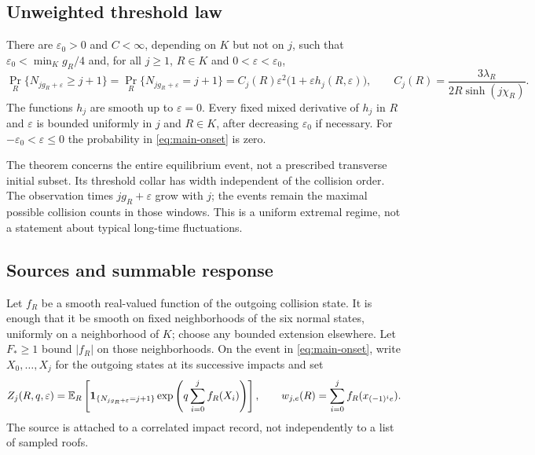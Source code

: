 \subsection{Unweighted threshold law}
\begin{theorem}\label{thm:unweighted}
There are $\varepsilon_0>0$ and $C<\infty$, depending on $K$ but not on
$j$, such that $\varepsilon_0<\min_K g_R/4$ and, for all $j\ge1$,
$R\in K$ and $0<\varepsilon<\varepsilon_0$,
\begin{equation}\label{eq:main-onset}
 \Pr_R\{N_{jg_R+\varepsilon}\ge j+1\}
 =\Pr_R\{N_{jg_R+\varepsilon}=j+1\}
 =C_j(R)\varepsilon^2\bigl(1+\varepsilon h_j(R,\varepsilon)\bigr),
 \qquad C_j(R)=\frac{3\lambda_R}{2R\sinh(j\chi_R)}.
\end{equation}
The functions $h_j$ are smooth up to $\varepsilon=0$. Every fixed
mixed derivative of $h_j$ in $R$ and $\varepsilon$ is bounded uniformly
in $j$ and $R\in K$, after decreasing $\varepsilon_0$ if necessary.
For $-\varepsilon_0<\varepsilon\le0$ the probability in
\eqref{eq:main-onset} is zero.
\end{theorem}

The theorem concerns the entire equilibrium event, not a prescribed
transverse initial subset. Its threshold collar has width independent
of the collision order. The observation times $jg_R+\varepsilon$ grow
with $j$; the events remain the maximal possible collision counts in
those windows. This is a uniform extremal regime, not a statement about
typical long-time fluctuations.

\subsection{Sources and summable response}
Let $f_R$ be a smooth real-valued function of the outgoing collision
state. It is enough that it be smooth on fixed neighborhoods of the six
normal states, uniformly on a neighborhood of $K$; choose any bounded
extension elsewhere. Let $F_*\ge1$ bound $|f_R|$ on those neighborhoods.
On the event in \eqref{eq:main-onset}, write $X_0,\ldots,X_j$ for the
outgoing states at its successive impacts and set
\[
 Z_j(R,q,\varepsilon)=
 \mathbb E_R\left[\mathbf1_{\{N_{jg_R+\varepsilon}=j+1\}}
             \exp\left(q\sum_{i=0}^j f_R(X_i)\right)\right],
 \qquad
 w_{j,e}(R)=\sum_{i=0}^j f_R(x_{(-1)^i e}).
\]
The source is attached to a correlated impact record, not independently
to a list of sampled roofs.

